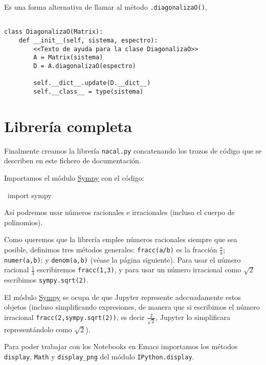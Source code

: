 \documentclass[11pt]{report}
\begin{document}
Es una forma alternativa de llamar al método \texttt{.diagonalizaO()},
\begin{verbatim}

class DiagonalizaO(Matrix):
    def __init__(self, sistema, espectro):
        <<Texto de ayuda para la clase DiagonalizaO>>
        A = Matrix(sistema)
        D = A.diagonalizaO(espectro)
            
        self.__dict__.update(D.__dict__)
        self.__class__ = type(sistema)

\end{verbatim}


\part{Librería completa}
\label{sec:org5846e93}

Finalmente creamos la librería \texttt{nacal.py} concatenando los trozos de
código que se describen en este fichero de documentación.

Importamos el módulo \href{https://www.sympy.org/en/index.html}{Sympy} con el código:
\begin{center}
~import sympy~
\end{center}
Así podremos usar números racionales e irracionales (incluso el cuerpo
de polinomios). 

Como queremos que la librería emplee números racionales siempre que
sea posible, definimos tres métodos generales: \texttt{fracc(a/b)} es la
fracción \(\frac{a}{b}\); \texttt{numer(a,b)}; y \texttt{denom(a,b)} (véase la página
siguiente). Para usar el número racional \(\frac{1}{3}\) escribiremos
\texttt{fracc(1,3)}, y para usar un número irracional como \(\sqrt{2}\)
escribimos \texttt{sympy.sqrt(2)}. 

El módulo \href{https://www.sympy.org/en/index.html}{Sympy} se ocupa de que Jupyter represente adecuadamente estos
objetos (incluso simplificando expresiones, de manera que si
escribimos el número irracional \texttt{fracc(2,sympy.sqrt(2))}, es decir
\(\frac{2}{\sqrt{2}}\), Jupyter lo simplificara representándolo como
\(\sqrt{2}\)).

Para poder trabajar con los Notebooks en Emacs importamos los métodos
\texttt{display}, \texttt{Math} y \texttt{display\_png} del módulo \texttt{IPython.display}.
\end{document}
